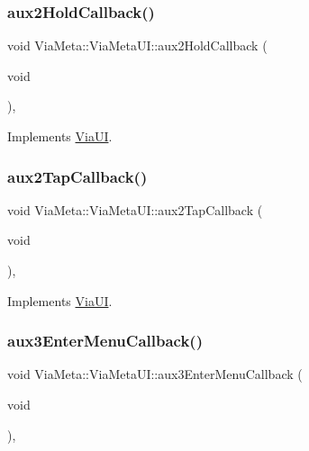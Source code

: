 \subsubsection{\texorpdfstring{aux2\+Hold\+Callback()}{aux2HoldCallback()}}
{\footnotesize\ttfamily void Via\+Meta\+::\+Via\+Meta\+U\+I\+::aux2\+Hold\+Callback (\begin{DoxyParamCaption}\item[{void}]{ }\end{DoxyParamCaption})\hspace{0.3cm}{\ttfamily [override]}, {\ttfamily [virtual]}}



Implements \mbox{\hyperlink{class_via_u_i_a42545b69c2bbbb036f633140fd8007d6}{Via\+UI}}.

\mbox{\label{class_via_meta_1_1_via_meta_u_i_a2d1e0164ad7d84c410cc90cefe9730ce}} 
\subsubsection{\texorpdfstring{aux2\+Tap\+Callback()}{aux2TapCallback()}}
{\footnotesize\ttfamily void Via\+Meta\+::\+Via\+Meta\+U\+I\+::aux2\+Tap\+Callback (\begin{DoxyParamCaption}\item[{void}]{ }\end{DoxyParamCaption})\hspace{0.3cm}{\ttfamily [override]}, {\ttfamily [virtual]}}



Implements \mbox{\hyperlink{class_via_u_i_ae5e009dc22002f62e6bff8dd76d2f745}{Via\+UI}}.

\mbox{\label{class_via_meta_1_1_via_meta_u_i_a31f9a7e08ee2d77d7aa96b644369e92d}} 
\subsubsection{\texorpdfstring{aux3\+Enter\+Menu\+Callback()}{aux3EnterMenuCallback()}}
{\footnotesize\ttfamily void Via\+Meta\+::\+Via\+Meta\+U\+I\+::aux3\+Enter\+Menu\+Callback (\begin{DoxyParamCaption}\item[{void}]{ }\end{DoxyParamCaption})\hspace{0.3cm}{\ttfamily [override]}, {\ttfamily [virtual]}}



